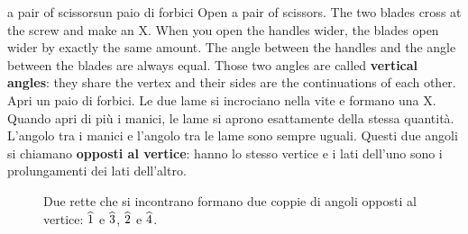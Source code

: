 \label{sec:vertical}
\begin{anchor}{a pair of scissors}{un paio di forbici}
Open a pair of scissors. The two blades cross at the screw and make an X. When you open the handles wider, the blades open wider by exactly the same amount. The angle between the handles and the angle between the blades are always equal. Those two angles are called \textbf{vertical angles}: they share the vertex and their sides are the continuations of each other.
\tcblower
Apri un paio di forbici. Le due lame si incrociano nella vite e formano una X. Quando apri di più i manici, le lame si aprono esattamente della stessa quantità. L'angolo tra i manici e l'angolo tra le lame sono sempre uguali. Questi due angoli si chiamano \textbf{opposti al vertice}: hanno lo stesso vertice e i lati dell'uno sono i prolungamenti dei lati dell'altro.
\end{anchor}

\begin{figure}[htbp]
\centering
%
      {Due rette che si incontrano formano due coppie di angoli opposti al vertice: $\widehat{1}$ e $\widehat{3}$, $\widehat{2}$ e $\widehat{4}$.}
\label{fig:vertical}
\end{figure}

